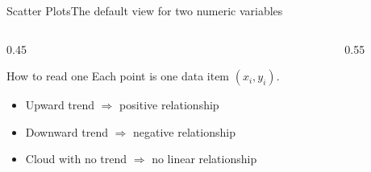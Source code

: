 \documentclass[aspectratio=169,11pt]{beamer}
\begin{document}
\begin{frame}{Scatter Plots}{The default view for two numeric variables}
  \begin{columns}[T]
    \begin{column}{0.45\textwidth}
      \begin{block}{How to read one}
        \small Each point is one data item $(x_i, y_i)$.
        \begin{itemize}\small
          \item Upward trend $\Rightarrow$ positive relationship
          \item Downward trend $\Rightarrow$ negative relationship
          \item Cloud with no trend $\Rightarrow$ no linear relationship
        \end{itemize}
      \end{block}
    \end{column}
    \begin{column}{0.55\textwidth}
      \begin{center}
      \end{center}
    \end{column}
  \end{columns}
\end{frame}
\end{document}

